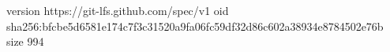 version https://git-lfs.github.com/spec/v1
oid sha256:bfcbe5d6581e174c7f3c31520a9fa06fc59df32d86c602a38934e8784502e76b
size 994
